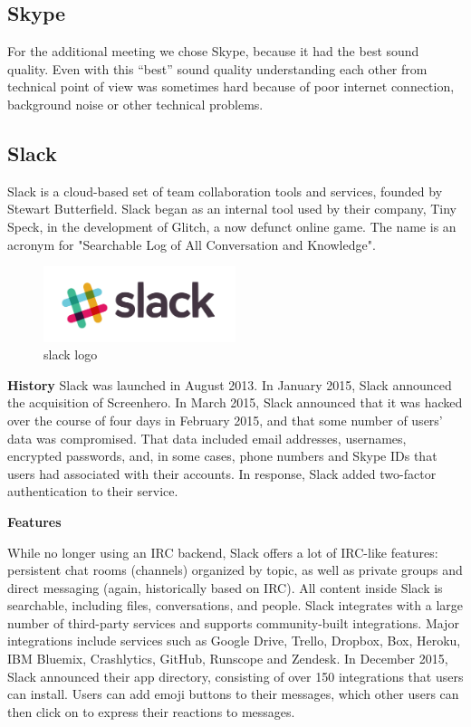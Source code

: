 \subsection{Skype}
For the additional meeting we chose Skype, because it had the best sound quality. Even with this “best” sound quality understanding each other from technical point of view was sometimes hard because of poor internet connection, background noise or other technical problems.

\subsection{Slack}
Slack is a cloud-based set of team collaboration tools and services, founded by Stewart Butterfield. Slack began as an internal tool used by their company, Tiny Speck, in the development of Glitch, a now defunct online game. The name is an acronym for "Searchable Log of All Conversation and Knowledge".
\begin{figure}[h]
	\centering
	\caption{slack logo}
	\includegraphics[width=0.5\textwidth]{images/slack_logo.png}
\end{figure}
\textbf{History}
Slack was launched in August 2013. In January 2015, Slack announced the acquisition of Screenhero.
In March 2015, Slack announced that it was hacked over the course of four days in February 2015, and that some number of users’ data was compromised. That data included email addresses, usernames, encrypted passwords, and, in some cases, phone numbers and Skype IDs that users had associated with their accounts. In response, Slack added two-factor authentication to their service.

\textbf{Features}

While no longer using an IRC backend, Slack offers a lot of IRC-like features: persistent chat rooms (channels) organized by topic, as well as private groups and direct messaging (again, historically based on IRC). All content inside Slack is searchable, including files, conversations, and people. Slack integrates with a large number of third-party services and supports community-built integrations. Major integrations include services such as Google Drive, Trello, Dropbox, Box, Heroku, IBM Bluemix, Crashlytics, GitHub, Runscope and Zendesk. In December 2015, Slack announced their app directory, consisting of over 150 integrations that users can install. Users can add emoji buttons to their messages, which other users can then click on to express their reactions to messages.

